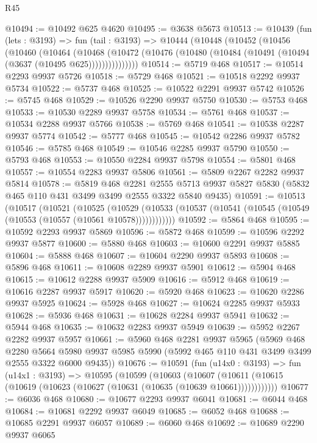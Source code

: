 \begin{lexlean}{R45}
\begin{coremodule}
@10494 := @10492 @625 @4620
@10495 := @3638 @5673
@10513 := @10439
    (fun (lets : @3193) =>
    fun (tail : @3193) =>
    @10444
      (@10448
        (@10452
          (@10456
            (@10460
              (@10464
                (@10468
                  (@10472 (@10476 (@10480 (@10484 (@10491 (@10494 (@3637 (@10495 @625)))))))))))))))
@10514 := @5719 @468
@10517 := @10514 @2293 @9937 @5726
@10518 := @5729 @468
@10521 := @10518 @2292 @9937 @5734
@10522 := @5737 @468
@10525 := @10522 @2291 @9937 @5742
@10526 := @5745 @468
@10529 := @10526 @2290 @9937 @5750
@10530 := @5753 @468
@10533 := @10530 @2289 @9937 @5758
@10534 := @5761 @468
@10537 := @10534 @2288 @9937 @5766
@10538 := @5769 @468
@10541 := @10538 @2287 @9937 @5774
@10542 := @5777 @468
@10545 := @10542 @2286 @9937 @5782
@10546 := @5785 @468
@10549 := @10546 @2285 @9937 @5790
@10550 := @5793 @468
@10553 := @10550 @2284 @9937 @5798
@10554 := @5801 @468
@10557 := @10554 @2283 @9937 @5806
@10561 := @5809 @2267 @2282 @9937 @5814
@10578 := @5819
    @468
    @2281
    @2555
    @5713
    @9937
    @5827
    @5830
    (@5832 @465 @110 @431 @3499 @3499 @2555 @3322 @5840 @9435)
@10591 := @10513
    (@10517
      (@10521
        (@10525
          (@10529 (@10533 (@10537 (@10541 (@10545 (@10549 (@10553 (@10557 (@10561 @10578))))))))))))
@10592 := @5864 @468
@10595 := @10592 @2293 @9937 @5869
@10596 := @5872 @468
@10599 := @10596 @2292 @9937 @5877
@10600 := @5880 @468
@10603 := @10600 @2291 @9937 @5885
@10604 := @5888 @468
@10607 := @10604 @2290 @9937 @5893
@10608 := @5896 @468
@10611 := @10608 @2289 @9937 @5901
@10612 := @5904 @468
@10615 := @10612 @2288 @9937 @5909
@10616 := @5912 @468
@10619 := @10616 @2287 @9937 @5917
@10620 := @5920 @468
@10623 := @10620 @2286 @9937 @5925
@10624 := @5928 @468
@10627 := @10624 @2285 @9937 @5933
@10628 := @5936 @468
@10631 := @10628 @2284 @9937 @5941
@10632 := @5944 @468
@10635 := @10632 @2283 @9937 @5949
@10639 := @5952 @2267 @2282 @9937 @5957
@10661 := @5960
    @468
    @2281
    @9937
    @5965
    (@5969
      @468
      @2280
      @5664
      @5980
      @9937
      @5985
      @5990
      (@5992 @465 @110 @431 @3499 @3499 @2555 @3322 @6000 @9435))
@10676 := @10591
    (fun (u14x0 : @3193) =>
    fun (u14x1 : @3193) =>
    @10595
      (@10599
        (@10603
          (@10607 (@10611 (@10615 (@10619 (@10623 (@10627 (@10631 (@10635 (@10639 @10661))))))))))))
@10677 := @6036 @468
@10680 := @10677 @2293 @9937 @6041
@10681 := @6044 @468
@10684 := @10681 @2292 @9937 @6049
@10685 := @6052 @468
@10688 := @10685 @2291 @9937 @6057
@10689 := @6060 @468
@10692 := @10689 @2290 @9937 @6065

\end{coremodule}
\end{lexlean}
